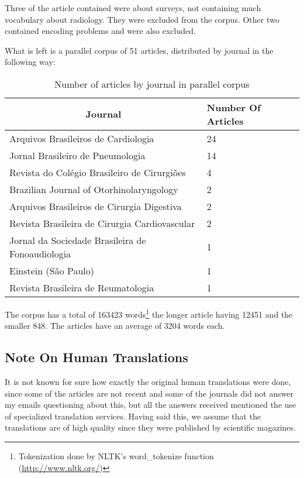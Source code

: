 Three of the article contained were about surveys, not containing much vocabulary about radiology. They were excluded from the corpus. Other two contained encoding problems and were also excluded.

What is left is a parallel corpus of 51 articles, distributed by journal in the following way:

\begin{table}[ht]
\centering
\caption{Number of articles by journal in parallel corpus}
\label{table:articles_by_journal}
\begin{tabular}{@{}ll@{}}
\toprule
\multicolumn{1}{c}{\textbf{Journal}}                 & \textbf{Number Of Articles} \\ \midrule
Arquivos Brasileiros de Cardiologia         & 24                          \\
Jornal Brasileiro de Pneumologia            & 14                          \\
Revista do Colégio Brasileiro de Cirurgiões & 4                           \\
Brazilian Journal of Otorhinolaryngology    & 2                           \\
Arquivos Brasileiros de Cirurgia Digestiva  & 2                           \\
Revista Brasileira de Cirurgia Cardiovascular        & 2                           \\
Jornal da Sociedade Brasileira de Fonoaudiologia     & 1                           \\
Einstein (São Paulo)                                 & 1                           \\
Revista Brasileira de Reumatologia                   & 1                           \\ \bottomrule
\end{tabular}
\end{table}

The corpus has a total of 163423 words\footnote{Tokenization done by NLTK's word\_tokenize function (\url{http://www.nltk.org/})} the longer article having 12451 and the smaller 848. The articles have an average of 3204 words each. 

\subsection{Note On Human Translations}

It is not known for sure how exactly the original human translations were done, since some of the articles are not recent and some of the journals did not answer my emails questioning about this, but all the answers received mentioned the use of specialized translation services. Having said this, we assume that the translations are of high quality since they were published by scientific magazines. 

